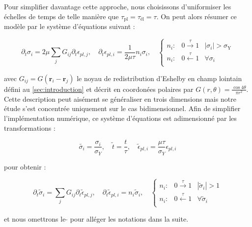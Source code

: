 \subparagraph{}Pour simplifier davantage cette approche, nous choisissons d'uniformiser les échelles de temps de telle manière que $\tau_{\text{pl}} = \tau_{\text{él}} = \tau$. On peut alors résumer ce modèle par le système d'équations suivant :

\begin{equation}
	\partial_t\sigma_i = 2\mu\sum_{j}G_{ij}\partial_t \epsilon_{pl,j},\quad \partial_t \epsilon_{pl,i} = \frac{1}{2\mu\tau}n_i \sigma_i,\quad
	\left\{
    \begin{array}{lcc}
    n_i: & 0\xrightarrow{\tau}1 & |\sigma_i|>\sigma_\mathrm{Y} \\
    n_i: & 0\xleftarrow{\tau}1 & \forall \sigma_i\\
    \end{array}
    \right.
\label{eq:PicardRules}
\end{equation}

\noindent avec $G_{ij} = G(\mathbf{r}_i-\mathbf{r}_j)$ le noyau de redistribution d'Eshelby en champ lointain défini au \autoref{sec:introduction} et décrit en coordonées polaires par $G(r,\theta) = \frac{\cos 4\theta}{\pi r^2}$. Cette description peut aisément se généraliser en trois dimensions mais notre étude s'est concentrée uniquement sur le cas bidimensionnel. Afin de simplifier l'implémentation numérique, ce système d'équations est adimensionné par les transformations :

\begin{equation}
	\tilde{\sigma_i} = \frac{\sigma_i}{\sigma_Y},\quad \tilde{t} = \frac{t}{\tau}, \quad \tilde{\epsilon}_{pl,i} = \frac{\mu\tau}{\sigma_Y}\epsilon_{pl,i}
	\label{eq:PicardDim}
\end{equation}

\noindent pour obtenir :

\begin{equation}
	\partial_t\tilde{\sigma}_i = \sum_{j}G_{ij}\partial_t \tilde{\epsilon}_{pl,j},\quad \partial_t \tilde{\epsilon}_{pl,i} = n_i \tilde{\sigma}_i,\quad
	\left\{
    \begin{array}{lcc}
    n_i: & 0\xrightarrow{\tau}1 & |\tilde{\sigma}_i|>1 \\
    n_i: & 0\xleftarrow{\tau}1 & \forall \tilde{\sigma}_i\\
    \end{array}
    \right.
\label{eq:PicardRulesAdim}
\end{equation}

\noindent et nous omettrons le $\tilde{}$ pour alléger les notations dans la suite.

